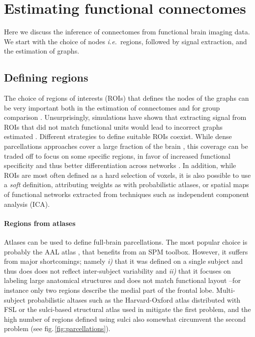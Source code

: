 \documentclass[5p]{elsarticle}
\begin{document}

\section{Estimating functional connectomes}

Here we discuss the inference of connectomes from functional brain
imaging data. We start with the choice of nodes \emph{i.e.}\ regions,
followed by signal extraction, and the estimation of graphs.

\subsection{Defining regions}

The choice of regions of interests (ROIs) that defines the nodes of the
graphs can be very important both in the estimation of connectomes and
for group comparison \cite{wang2009}. Unsurprisingly, simulations have
shown that extracting signal from ROIs that did not match functional
units would lead to incorrect graphs estimated \cite{smith2011}.
%
Different strategies to define suitable ROIs coexist. While dense parcellations approaches cover
a large fraction of the brain \cite{achard2006, varoquaux2010c,
wang2009}, this coverage can be traded off to focus on some specific
regions, in favor of increased functional specificity and thus better
differentiation across networks \cite{greicius2003, fair2009,
varoquaux2010b}. In addition, while
ROIs are most often defined as a hard selection of voxels, it is also
possible to use a \emph{soft} definition, attributing weights as with
probabilistic atlases, or spatial maps of functional networks extracted
from techniques such as independent component analysis (ICA).


\paragraph{Regions from atlases}
%
Atlases can be used to define full-brain parcellations. The most popular
choice is probably the AAL atlas \cite{tzourio-mazoyer2002a}, that
benefits from an SPM toolbox. However, it suffers from major
shortcomings; namely \emph{i)} that it was defined on a single subject
and thus does does not reflect inter-subject variability and \emph{ii)}
that it focuses on labeling large anatomical structures and does not match
functional layout --for instance only two regions describe the medial
part of the frontal lobe. Multi-subject probabilistic altases such as the
Harvard-Oxford atlas distributed with FSL \cite{smith2004} or the
sulci-based structural atlas used in \cite{varoquaux2010c} mitigate the
first problem, and the high number of regions defined using sulci also
somewhat circumvent the second problem (see
fig.\,\ref{fig:parcellations}).
\end{document}
